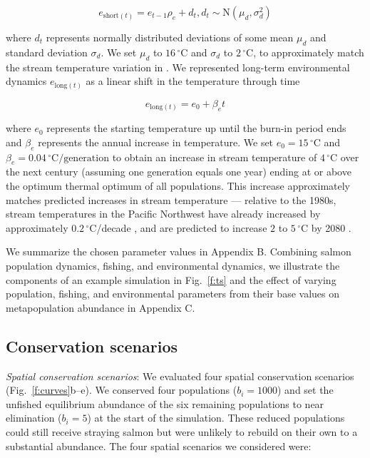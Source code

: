 \documentclass[12pt,english]{article}
\newcommand{\somparam}{Appendix B}
\newcommand{\somsens}{Appendix C}
\begin{document}
\begin{spacing}{1.3}
\[e_{\mathrm{short}(t)} = e_{t-1} \rho_e + d_t, d_t \sim \mathrm{N}(\mu_d, \sigma_d^2)\]

\noindent
where $d_t$ represents normally distributed deviations of some mean $\mu_d$ and standard deviation $\sigma_d$. We set $\mu_d$ to $16\,^{\circ}\mathrm{C}$ and $\sigma_d$ to $2\,^{\circ}\mathrm{C}$, to approximately match the stream temperature variation in \citet{eliason2011}. We represented long-term environmental dynamics $e_{\mathrm{long}(t)}$ as a linear shift in the temperature through time

\[e_{\mathrm{long}(t)} = e_0 + \beta_e t\]

\noindent
where $e_0$ represents the starting temperature up until the burn-in period ends and $\beta_e$ represents the annual increase in temperature. We set $e_0 = 15\,^{\circ}\mathrm{C}$ and $\beta_e = 0.04\,^{\circ}\mathrm{C} / \mathrm{generation}$ to obtain an increase in stream temperature of $4\,^{\circ}\mathrm{C}$ over the next century (assuming one generation equals one year) ending at or above the optimum thermal optimum of all populations. This increase approximately matches predicted increases in stream temperature --- relative to the 1980s, stream temperatures in the Pacific Northwest have already increased by approximately $0.2\,^{\circ}\mathrm{C}$/decade \citep{isaak2012}, and are predicted to increase $2$ to $5\,^{\circ}\mathrm{C}$ by 2080 \citep{mantua2010}.

We summarize the chosen parameter values in \somparam. Combining salmon population dynamics, fishing, and environmental dynamics, we illustrate the components of an example simulation in Fig.~\ref{f:ts} and the effect of varying population, fishing, and environmental parameters from their base values on metapopulation abundance in \somsens.

\subsection{Conservation scenarios}\label{conservation-scenarios}

\emph{Spatial conservation scenarios}: We evaluated four spatial conservation scenarios (Fig.~\ref{f:curves}b--e). We conserved four populations ($b_i = 1000$) and set the unfished equilibrium abundance of the six remaining populations to near elimination ($b_i = 5$) at the start of the simulation. These reduced populations could still receive straying salmon but were unlikely to rebuild on their own to a substantial abundance. The four spatial scenarios we considered were:


\end{spacing}
\end{document}
